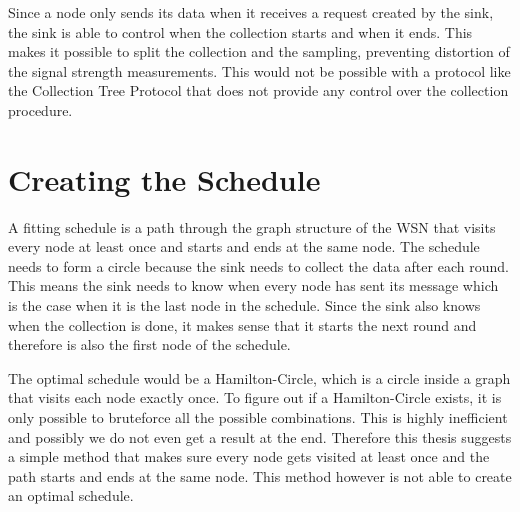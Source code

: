 Since a node only sends its data when it receives a request created by the sink, the sink is able to control when the collection starts and when it ends. This makes it possible to split the collection and the sampling, preventing distortion of the signal strength measurements. This would not be possible with a protocol like the Collection Tree Protocol that does not provide any control over the collection procedure. 

\section{Creating the Schedule}
\label{chp:apr_creatingSchedule}
A fitting schedule is a path through the graph structure of the WSN that visits every node at least once and starts and ends at the same node. The schedule needs to form a circle because the sink needs to collect the data after each round. This means the sink needs to know when every node has sent its message which is the case when it is the last node in the schedule. Since the sink also knows when the collection is done, it makes sense that it starts the next round and therefore is also the first node of the schedule. 

The optimal schedule would be a Hamilton-Circle, which is a circle inside a graph that visits each node exactly once. To figure out if a Hamilton-Circle exists, it is only possible to bruteforce all the possible combinations. This is highly inefficient and possibly we do not even get a result at the end. Therefore this thesis suggests a simple method that makes sure every node gets visited at least once and the path starts and ends at the same node. This method however is not able to create an optimal schedule.

